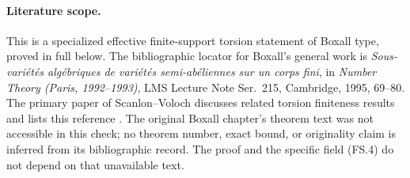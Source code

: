 \documentclass[11pt,a4paper]{article}
\begin{document}
\paragraph{Literature scope.}
This is a specialized effective finite-support torsion statement
of Boxall type, proved in full below. The bibliographic locator
for Boxall's general work is
\emph{Sous-vari\'et\'es alg\'ebriques de vari\'et\'es
semi-ab\'eliennes sur un corps fini}, in \emph{Number Theory
(Paris, 1992--1993)}, LMS Lecture Note Ser.~215, Cambridge, 1995,
69--80. The primary paper of Scanlon--Voloch discusses related torsion
finiteness results and lists this reference
\cite[Introduction and reference \textnormal{[Box]}]{ScanlonVoloch1999}.
The original Boxall chapter's theorem text was not accessible in
this check; no theorem number, exact bound, or originality claim
is inferred from its bibliographic record. The proof and the
specific field (FS.4) do not depend on that unavailable text.
\end{document}
